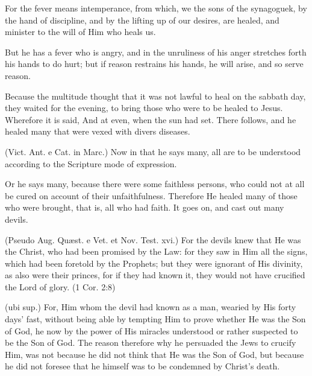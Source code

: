  For the fever means intemperance, from which, we the sons of the synagoguek, by the hand of discipline, and by the lifting up of our desires, are healed, and minister to the will of Him who heals us.

 But he has a fever who is angry, and in the unruliness of his anger stretches forth his hands to do hurt; but if reason restrains his hands, he will arise, and so serve reason.

 

 Because the multitude thought that it was not lawful to heal on the sabbath day, they waited for the evening, to bring those who were to be healed to Jesus. Wherefore it is said, And at even, when the sun had set. There follows, and he healed many that were vexed with divers diseases.

 (Vict. Ant. e Cat. in Marc.) Now in that he says many, all are to be understood according to the Scripture mode of expression.

 Or he says many, because there were some faithless persons, who could not at all be cured on account of their unfaithfulness. Therefore He healed many of those who were brought, that is, all who had faith. It goes on, and cast out many devils.

 (Pseudo Aug. Quæst. e Vet. et Nov. Test. xvi.) For the devils knew that He was the Christ, who had been promised by the Law: for they saw in Him all the signs, which had been foretold by the Prophets; but they were ignorant of His divinity, as also were their princes, for if they had known it, they would not have crucified the Lord of glory. (1 Cor. 2:8)

 (ubi sup.) For, Him whom the devil had known as a man, wearied by His forty days’ fast, without being able by tempting Him to prove whether He was the Son of God, he now by the power of His miracles understood or rather suspected to be the Son of God. The reason therefore why he persuaded the Jews to crucify Him, was not because he did not think that He was the Son of God, but because he did not foresee that he himself was to be condemned by Christ’s death.

